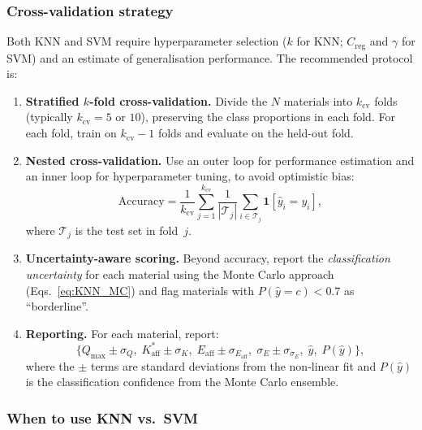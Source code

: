 	\subsubsection{Cross-validation strategy}

	Both KNN and SVM require hyperparameter selection ($k$ for KNN;
	$C_{\mathrm{reg}}$ and $\gamma$ for SVM) and an estimate of
	generalisation performance.  The recommended protocol is:

	\begin{enumerate}
		\item \textbf{Stratified $k$-fold cross-validation.}
		Divide the $N$ materials into $k_{\mathrm{cv}}$ folds
		(typically $k_{\mathrm{cv}} = 5$ or $10$), preserving the
		class proportions in each fold.  For each fold,
		train on $k_{\mathrm{cv}}-1$ folds and evaluate on the
		held-out fold.

		\item \textbf{Nested cross-validation.}
		Use an outer loop for performance estimation and an inner
		loop for hyperparameter tuning, to avoid optimistic bias:
		\begin{equation}
			\text{Accuracy}
			= \frac{1}{k_{\mathrm{cv}}}
			\sum_{j=1}^{k_{\mathrm{cv}}}
			\frac{1}{|\mathcal{T}_j|}
			\sum_{i \in \mathcal{T}_j}
			\mathbf{1}[\hat{y}_i = y_i],
		\end{equation}
		where $\mathcal{T}_j$ is the test set in fold~$j$.

		\item \textbf{Uncertainty-aware scoring.}
		Beyond accuracy, report the \emph{classification
		uncertainty} for each material using the Monte Carlo
		approach (Eqs.~\eqref{eq:KNN_MC}) and flag materials
		with $P(\hat{y} = c) < 0.7$ as ``borderline''.

		\item \textbf{Reporting.}
		For each material, report:
		\begin{equation}
			\bigl\{
			Q_{\max} \pm \sigma_{Q},\;
			K_{\mathrm{aff}}^{\ast} \pm \sigma_{K},\;
			E_{\mathrm{aff}} \pm \sigma_{E_{\mathrm{aff}}},\;
			\sigma_E \pm \sigma_{\sigma_E},\;
			\hat{y},\;
			P(\hat{y})
			\bigr\},
		\end{equation}
		where the $\pm$ terms are standard deviations from the
		non-linear fit and $P(\hat{y})$ is the classification
		confidence from the Monte Carlo ensemble.
	\end{enumerate}

	\subsubsection{When to use KNN vs.\ SVM}

